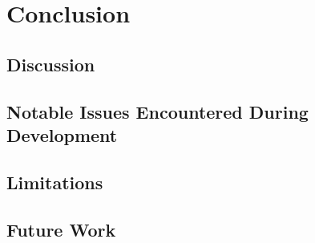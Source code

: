 \chapter{Conclusion}
\vspace{-1.6em}
%

\minitoc%
\thispagestyle{empty}
\newpage

\section{Discussion}
\section{Notable Issues Encountered During Development}
\section{Limitations}
\section{Future Work}
